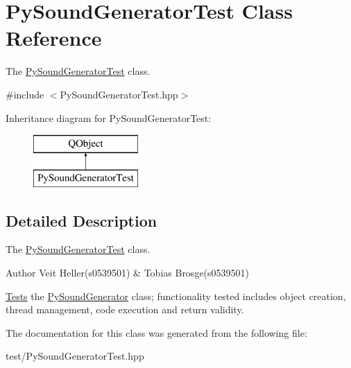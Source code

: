 \hypertarget{classPySoundGeneratorTest}{\section{Py\+Sound\+Generator\+Test Class Reference}
\label{classPySoundGeneratorTest}
}


The \hyperlink{classPySoundGeneratorTest}{Py\+Sound\+Generator\+Test} class.  




{\ttfamily \#include $<$Py\+Sound\+Generator\+Test.\+hpp$>$}

Inheritance diagram for Py\+Sound\+Generator\+Test\+:\begin{figure}[H]
\begin{center}
\leavevmode
\includegraphics[height=2.000000cm]{classPySoundGeneratorTest}
\end{center}
\end{figure}


\subsection{Detailed Description}
The \hyperlink{classPySoundGeneratorTest}{Py\+Sound\+Generator\+Test} class. 

\begin{DoxyAuthor}{Author}
Veit Heller(s0539501) \& Tobias Brosge(s0539501)
\end{DoxyAuthor}
\hyperlink{structTests}{Tests} the \hyperlink{classPySoundGenerator}{Py\+Sound\+Generator} class; functionality tested includes object creation, thread management, code execution and return validity. 

The documentation for this class was generated from the following file\+:\begin{DoxyCompactItemize}
\item 
test/Py\+Sound\+Generator\+Test.\+hpp\end{DoxyCompactItemize}
